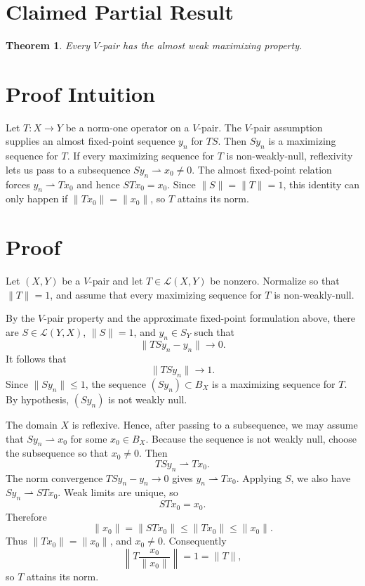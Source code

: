 \documentclass[11pt]{article}
\newtheorem{theorem}{Theorem}
\newcommand{\cL}{\mathcal L}
\begin{document}
\section*{Claimed Partial Result}

\begin{theorem}
Every \(V\)-pair has the almost weak maximizing property.
\end{theorem}

\section*{Proof Intuition}

Let \(T:X\to Y\) be a norm-one operator on a \(V\)-pair.  The \(V\)-pair
assumption supplies an almost fixed-point sequence \(y_n\) for \(TS\).  Then
\(S y_n\) is a maximizing sequence for \(T\).  If every maximizing sequence
for \(T\) is non-weakly-null, reflexivity lets us pass to a subsequence
\(S y_n\rightharpoonup x_0\ne0\).  The almost fixed-point relation forces
\(y_n\rightharpoonup T x_0\) and hence \(S T x_0=x_0\).  Since
\(\|S\|=\|T\|=1\), this identity can only happen if
\(\|T x_0\|=\|x_0\|\), so \(T\) attains its norm.

\section*{Proof}

Let \((X,Y)\) be a \(V\)-pair and let \(T\in\cL(X,Y)\) be nonzero.  Normalize
so that \(\|T\|=1\), and assume that every maximizing sequence for \(T\) is
non-weakly-null.

By the \(V\)-pair property and the approximate fixed-point formulation above,
there are \(S\in\cL(Y,X)\), \(\|S\|=1\), and \(y_n\in S_Y\) such that
\[
  \|T S y_n-y_n\|\to 0 .
\]
It follows that
\[
  \|T S y_n\|\to 1 .
\]
Since \(\|S y_n\|\le 1\), the sequence \((S y_n)\subset B_X\) is a maximizing
sequence for \(T\).  By hypothesis, \((S y_n)\) is not weakly null.

The domain \(X\) is reflexive.  Hence, after passing to a subsequence, we may
assume that \(S y_n\rightharpoonup x_0\) for some \(x_0\in B_X\).  Because
the sequence is not weakly null, choose the subsequence so that \(x_0\ne0\).
Then
\[
  T S y_n \rightharpoonup T x_0 .
\]
The norm convergence \(T S y_n-y_n\to0\) gives \(y_n\rightharpoonup T x_0\).
Applying \(S\), we also have \(S y_n\rightharpoonup S T x_0\).  Weak limits
are unique, so
\[
  S T x_0=x_0 .
\]
Therefore
\[
  \|x_0\|=\|S T x_0\|\le \|T x_0\|\le \|x_0\|.
\]
Thus \(\|T x_0\|=\|x_0\|\), and \(x_0\ne0\).  Consequently
\[
  \left\|T\frac{x_0}{\|x_0\|}\right\|=1=\|T\|,
\]
so \(T\) attains its norm.
\end{document}
